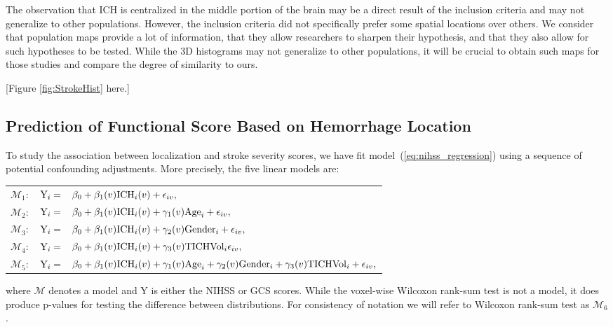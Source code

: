 \documentclass[10pt]{article}\usepackage[]{graphicx}\usepackage[]{color}
\begin{document}
The observation that ICH is centralized in the middle portion of the brain may be a direct result of the inclusion criteria and may not generalize to other populations. However, the inclusion criteria \citep{mould_minimally_2013} did not specifically prefer some spatial locations over others. We consider that population maps provide a lot of information, that they allow researchers to sharpen their hypothesis, and that they also allow for such hypotheses to be tested. While the 3D histograms may not generalize to other populations, it will be crucial to obtain such maps for those studies and compare the degree of similarity to ours.


[Figure \ref{fig:StrokeHist} here.]


\subsection{Prediction of Functional Score Based on Hemorrhage Location}

To study the association between localization and stroke severity scores, we have fit model~(\ref{eq:nihss_regression}) using a sequence of  potential confounding adjustments. More precisely, the five linear models are:

\vspace{0.1in}
\begin{tabular}{rll}
\noindent $\mathcal{M}_1:$ & $ {\rm Y}_i =$ & \hspace{-0.18in} $\beta_0+\beta_1(v) {\rm ICH}_i(v) + \epsilon_{iv}, $\\
$\mathcal{M}_2:$ & $ {\rm Y}_i = $ & \hspace{-0.18in} $ \beta_0+\beta_1(v) {\rm ICH}_i(v) + \gamma_1(v){\rm Age}_i + \epsilon_{iv}, $\\
$\mathcal{M}_3:$ & $ {\rm Y}_i = $ & \hspace{-0.18in} $ \beta_0+\beta_1(v) {\rm ICH}_i(v) + \gamma_2(v){\rm Gender}_i + \epsilon_{iv}, $\\
$\mathcal{M}_4:$ &$  {\rm Y}_i = $ & \hspace{-0.18in} $ \beta_0+\beta_1(v) {\rm ICH}_i(v) + \gamma_3(v){\rm TICHVol}_i \epsilon_{iv},$ \\
$\mathcal{M}_5:$ &$  {\rm Y}_i = $ & \hspace{-0.18in} $ \beta_0+\beta_1(v) {\rm ICH}_i(v) + \gamma_1(v){\rm Age}_i  +\gamma_2(v){\rm Gender}_i +\gamma_3(v){\rm TICHVol}_i + \epsilon_{iv},$ \\
\end{tabular}
\vspace{0.1in}
\newline
where $\mathcal{M}$ denotes a model and Y is either the NIHSS or GCS scores.  While the voxel-wise Wilcoxon rank-sum test is not a model, it does produce p-values for testing the difference between distributions. For consistency of notation we will refer to Wilcoxon rank-sum test as $\mathcal{M}_6$. 
\end{document}
